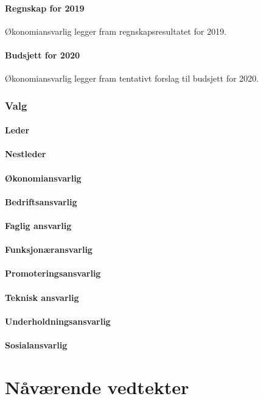 \documentclass[10pt,norsk,a4paper]{article}
\begin{document}
\subsection{Regnskap for 2019}
Økonomiansvarlig legger fram regnskapsresultatet for 2019.

\subsection{Budsjett for 2020}
Økonomiansvarlig legger fram tentativt forslag til budsjett for 2020.

\section{Valg}

\subsection{Leder}
\subsection{Nestleder}
\subsection{Økonomiansvarlig}
\subsection{Bedriftsansvarlig}
\subsection{Faglig ansvarlig}
\subsection{Funksjonæransvarlig}
\subsection{Promoteringsansvarlig}
\subsection{Teknisk ansvarlig}
\subsection{Underholdningsansvarlig}
\subsection{Sosialansvarlig}\label{lastpage}

\newpage
\part{Nåværende vedtekter}

\end{document}
